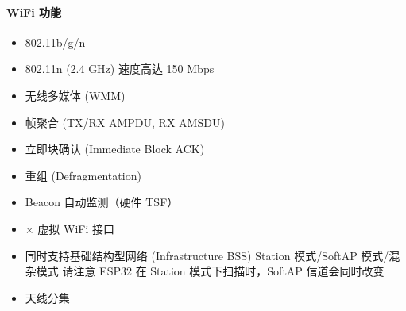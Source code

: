 \documentclass[a4paper,12pt,english]{sphinxmanual}
\begin{document}
\paragraph{WiFi 功能}
\label{\detokenize{dev-board/esp32:wifi}}\begin{itemize}
\item {} 
\sphinxAtStartPar
802.11b/g/n

\item {} 
\sphinxAtStartPar
802.11n (2.4 GHz) 速度高达 150 Mbps

\item {} 
\sphinxAtStartPar
无线多媒体 (WMM)

\item {} 
\sphinxAtStartPar
帧聚合 (TX/RX A\sphinxhyphen{}MPDU, RX A\sphinxhyphen{}MSDU)

\item {} 
\sphinxAtStartPar
立即块确认 (Immediate Block ACK)

\item {} 
\sphinxAtStartPar
重组 (Defragmentation)

\item {} 
\sphinxAtStartPar
Beacon 自动监测（硬件 TSF）

\item {} 
 × 虚拟 Wi\sphinxhyphen{}Fi 接口

\item {} 
\sphinxAtStartPar
同时支持基础结构型网络 (Infrastructure BSS) Station 模式/SoftAP 模式/混杂模式 请注意 ESP32 在 Station 模式下扫描时，SoftAP 信道会同时改变

\item {} 
\sphinxAtStartPar
天线分集

\end{itemize}
\end{document}
